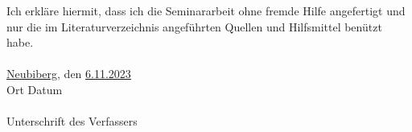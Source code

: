 \documentclass[12pt,a4paper]{scrartcl}
\begin{document}
\listoffigures
\pagebreak

\nocite{*}
\printbibliography

\pagebreak

Ich erkläre hiermit, dass ich die Seminararbeit ohne fremde Hilfe angefertigt und nur die im Literaturverzeichnis angeführten Quellen und Hilfsmittel benützt habe.\\
\\
\underline{Neubiberg}, den \underline{6.11.2023} \\
Ort  \hspace{2cm} Datum \\

\underline{\hspace{10cm}} \\
Unterschrift des Verfassers
\end{document}
